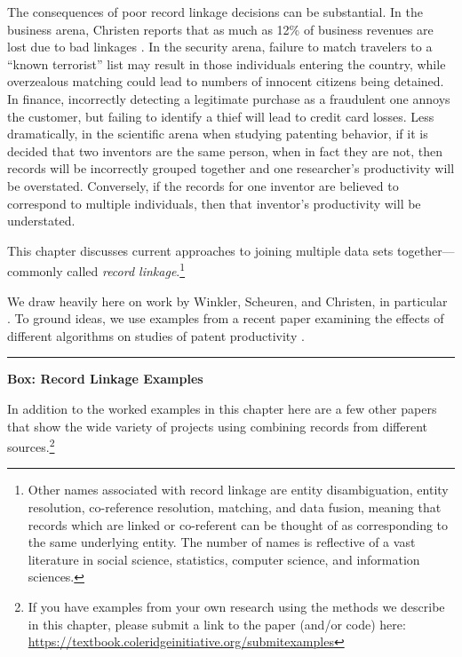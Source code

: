 \documentclass[]{krantz}
\begin{document}
The consequences of poor record linkage decisions can be substantial. In
the business arena, Christen reports that as much as 12\% of business
revenues are lost due to bad linkages \citep{christen2012data}. In the
security arena, failure to match travelers to a ``known terrorist'' list
may result in those individuals entering the country, while overzealous
matching could lead to numbers of innocent citizens being detained. In
finance, incorrectly detecting a legitimate purchase as a fraudulent one
annoys the customer, but failing to identify a thief will lead to credit
card losses. Less dramatically, in the scientific arena when studying
patenting behavior, if it is decided that two inventors are the same
person, when in fact they are not, then records will be incorrectly
grouped together and one researcher's productivity will be overstated.
Conversely, if the records for one inventor are believed to correspond
to multiple individuals, then that inventor's productivity will be
understated.

This chapter discusses current approaches to joining multiple data sets
together---commonly called \emph{record linkage}.\footnote{Other names
  associated with record linkage are entity disambiguation, entity
  resolution, co-reference resolution, matching, and data fusion,
  meaning that records which are linked or co-referent can be thought of
  as corresponding to the same underlying entity. The number of names is
  reflective of a vast literature in social science, statistics,
  computer science, and information sciences.}

We draw heavily here on work by Winkler, Scheuren, and Christen, in
particular \citep{herzog2007data, christen2012survey, christen2012data}.
To ground ideas, we use examples from a recent paper examining the
effects of different algorithms on studies of patent productivity
\citep{ventura2015seeing}.

\begin{center}\rule{0.5\linewidth}{\linethickness}\end{center}

\textbf{Box: Record Linkage Examples}

In addition to the worked examples in this chapter here are a few other
papers that show the wide variety of projects using combining records
from different sources.\footnote{If you have examples from your own
  research using the methods we describe in this chapter, please submit
  a link to the paper (and/or code) here:
  \url{https://textbook.coleridgeinitiative.org/submitexamples}}
\end{document}
